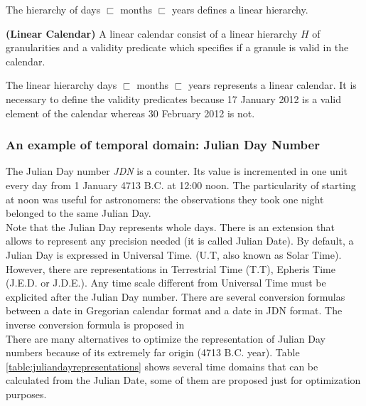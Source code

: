 The hierarchy of days $\sqsubset$ months $\sqsubset$ years defines a linear hierarchy.

\begin{definition}
\label{def:linear-calendar}
\textbf{(Linear Calendar)} A linear calendar consist of a linear hierarchy $H$ of granularities and a validity predicate which specifies if a granule is valid in  the calendar.
\end{definition}

The linear hierarchy days $\sqsubset$ months $\sqsubset$ years represents a linear calendar. It is necessary to define the validity predicates because 17 January 2012 is a valid element of the calendar whereas 30 February 2012 is not.
 
\subsubsection{\label{subsubsubsec:julian-day-number}An example of temporal domain: Julian Day Number}

The Julian Day number \emph{JDN} \cite{Dir96} is a counter. Its value is incremented in one unit every day from 1 January 4713 B.C. at 12:00 noon. The particularity of starting at noon was useful for astronomers: the observations they took one night belonged to the same Julian Day.\\
Note that the Julian Day represents whole days. There is an extension that allows to represent any precision needed (it is called Julian Date). By default, a Julian Day is expressed in Universal Time. (U.T, also known as Solar Time). However, there are representations in Terrestrial Time (T.T), Epheris Time (J.E.D. or J.D.E.). Any time scale different from Universal Time must be explicited after the Julian Day number. There are several conversion formulas~\cite{Usn}\cite{Wik}\cite{Lea} between a date in Gregorian calendar  format and a date in  JDN format. The inverse conversion formula is proposed in~\cite{Fliegel:1968:LEM:364096.364097}\\

There are many alternatives to optimize the representation of Julian Day numbers because of its extremely far origin (4713 B.C. year). Table \ref{table:juliandayrepresentations} shows several time domains that can be calculated from the Julian Date, some of them are proposed just for optimization purposes.



